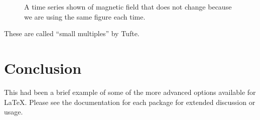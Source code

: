 \documentclass[draft]{aiaa-tc}%
\begin{document}
\begin{figure}
\begin{subfigmatrix}{4}
 \end{subfigmatrix}
 \caption{A time series shown of magnetic field that does not change
          because we are using the same figure each time.}
 \label{f:small_multiple}
\end{figure}
These are called ``small multiples'' by Tufte.

\section{Conclusion}

This had been a brief example of some of the more advanced options
available for \LaTeX.
Please see the documentation for each package for extended discussion or
usage.



\end{document}

